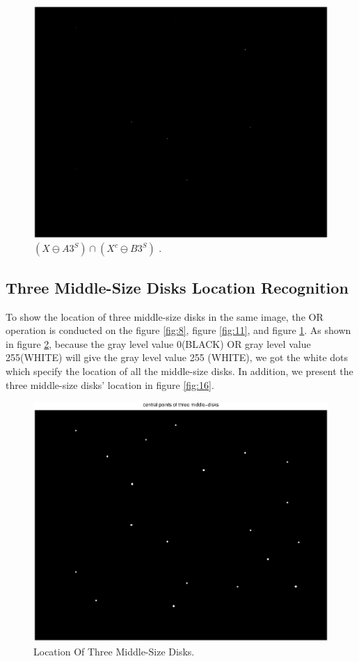 \documentclass[paper=a4, fontsize=11pt]{scrartcl}
\begin{document}
\begin{figure}
	\centering
	\includegraphics[width=12cm]{andresult.eps}
	\caption{$( X \ominus A3^S) \cap ( X^c \ominus B3^S)$ .}
	\label{fig:14}
\end{figure}

\subsection{Three Middle-Size Disks Location Recognition}
To show the location of three middle-size disks in the same image, the OR operation is conducted on the figure \ref{fig:8}, figure \ref{fig:11}, and figure \ref{fig:14}. As shown in figure \ref{fig:15}, because the gray level value 0(BLACK) OR gray level value 255(WHITE) will give the gray level value 255 (WHITE), we got the white dots which specify the location of all the middle-size disks. In addition, we present the three middle-size disks' location in figure \ref{fig:16}.


\begin{figure}
	\centering
	\includegraphics[width=12cm]{three.eps}
	\caption{Location Of Three Middle-Size Disks.}
	\label{fig:15}
\end{figure}
\end{document}
